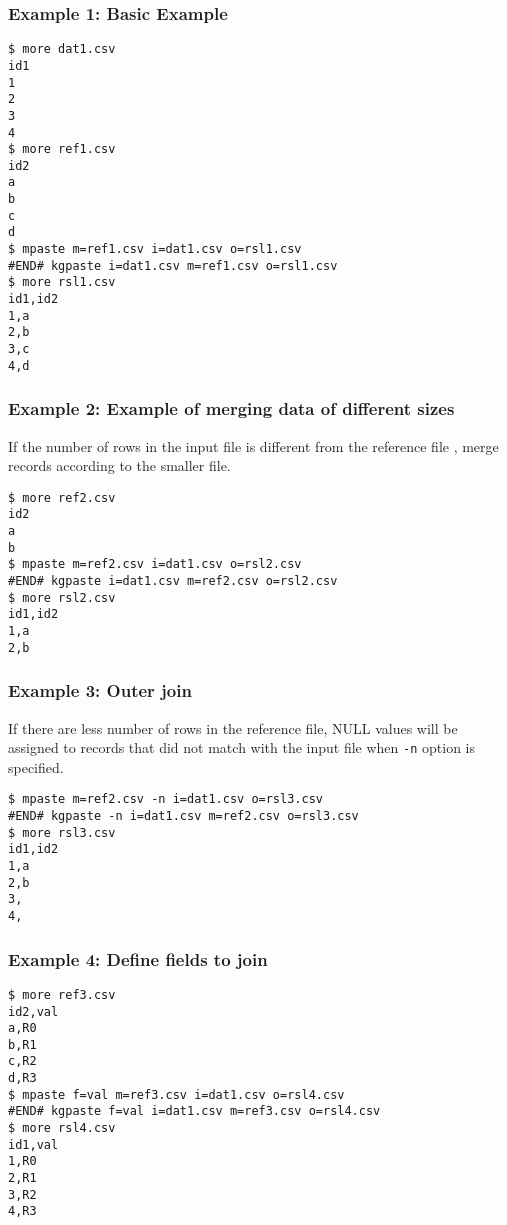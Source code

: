 \subsubsection*{Example 1: Basic Example}



\begin{Verbatim}[baselinestretch=0.7,frame=single]
$ more dat1.csv
id1
1
2
3
4
$ more ref1.csv
id2
a
b
c
d
$ mpaste m=ref1.csv i=dat1.csv o=rsl1.csv
#END# kgpaste i=dat1.csv m=ref1.csv o=rsl1.csv
$ more rsl1.csv
id1,id2
1,a
2,b
3,c
4,d
\end{Verbatim}
\subsubsection*{Example 2: Example of merging data of different sizes}

If the number of rows in the input file is different from the reference file , merge records according to the smaller file.


\begin{Verbatim}[baselinestretch=0.7,frame=single]
$ more ref2.csv
id2
a
b
$ mpaste m=ref2.csv i=dat1.csv o=rsl2.csv
#END# kgpaste i=dat1.csv m=ref2.csv o=rsl2.csv
$ more rsl2.csv
id1,id2
1,a
2,b
\end{Verbatim}
\subsubsection*{Example 3: Outer join}

If there are less number of rows in the reference file, NULL values will be assigned to records that did not match with the input file when \verb|-n| option is specified.


\begin{Verbatim}[baselinestretch=0.7,frame=single]
$ mpaste m=ref2.csv -n i=dat1.csv o=rsl3.csv
#END# kgpaste -n i=dat1.csv m=ref2.csv o=rsl3.csv
$ more rsl3.csv
id1,id2
1,a
2,b
3,
4,
\end{Verbatim}
\subsubsection*{Example 4: Define fields to join}



\begin{Verbatim}[baselinestretch=0.7,frame=single]
$ more ref3.csv
id2,val
a,R0
b,R1
c,R2
d,R3
$ mpaste f=val m=ref3.csv i=dat1.csv o=rsl4.csv
#END# kgpaste f=val i=dat1.csv m=ref3.csv o=rsl4.csv
$ more rsl4.csv
id1,val
1,R0
2,R1
3,R2
4,R3
\end{Verbatim}
